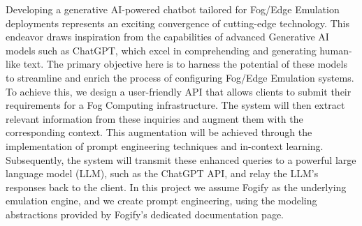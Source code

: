 Developing a generative AI-powered chatbot tailored for Fog/Edge Emulation
deployments represents an exciting convergence of cutting-edge technology. This
endeavor draws inspiration from the capabilities of advanced Generative AI
models such as ChatGPT, which excel in comprehending and generating human-like
text. The primary objective here is to harness the potential of these models to
streamline and enrich the process of configuring Fog/Edge Emulation systems. To
achieve this, we design a user-friendly API that allows clients to
submit their requirements for a Fog Computing infrastructure. The system will
then extract relevant information from these inquiries and augment them with
the corresponding context. This augmentation will be achieved through the
implementation of prompt engineering techniques and in-context learning.
Subsequently, the system will transmit these enhanced queries to a powerful
large language model (LLM), such as the ChatGPT API, and relay the LLM's
responses back to the client. In this project we assume Fogify as the
underlying
emulation engine, and we create prompt engineering, using the  modeling
abstractions provided by Fogify's dedicated documentation page.
